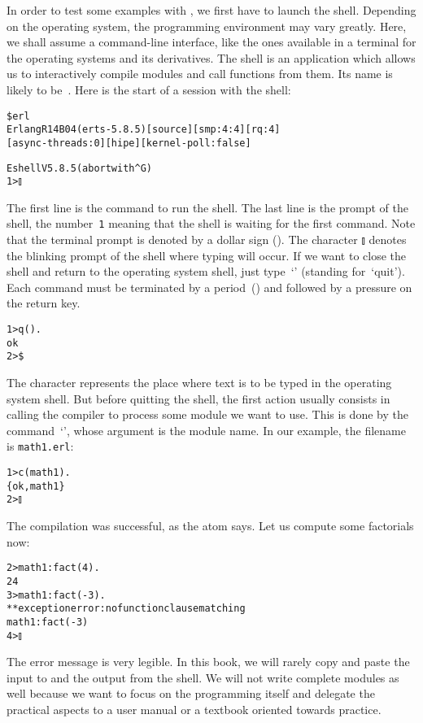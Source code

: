 In order to test some examples with , we first have to
launch the \Erlang shell. Depending on the operating system, the
programming environment may vary greatly. Here, we shall assume a
command\hyp{}line interface, like the ones available in a terminal for
the \Unix operating systems and its derivatives. The \Erlang shell is
an application which allows us to interactively compile modules and
call functions from them. Its name is likely to be~. Here
is the start of a session with the shell:
\begin{alltt}
\$ erl
Erlang R14B04 (erts-5.8.5) [source] [smp:4:4] [rq:4]
[async-threads:0] [hipe] [kernel-poll:false]

Eshell V5.8.5  (abort with ^G)
1> \(\talloblong\)
\end{alltt}
The first line is the command to run the shell. The last line is the
prompt of the \Erlang shell, the number~\texttt{1} meaning that the
shell is waiting for the first command. Note that the terminal prompt
is denoted by a dollar sign (\erlcode{\$}). The character
\(\talloblong\) denotes the blinking prompt of the \Erlang shell where
typing will occur. If we want to close the shell and return to the
operating system shell, just type~`' (standing
for~`quit'). Each command must be terminated by a period~()
and followed by a pressure on the return key.
\begin{alltt}
1> q().
ok
2> \$ \textvisiblespace
\end{alltt}
The character \erlcode{\textvisiblespace} represents the place where
text is to be typed in the operating system shell. But before quitting
the \Erlang shell, the first action usually consists in calling the
\Erlang compiler to process some module we want to use. This is done
by the command~`', whose argument is the module name. In
our example, the filename is \texttt{math1.erl}:
\begin{alltt}
1> c(math1).
\{ok,math1\}
2> \(\talloblong\)
\end{alltt}
The compilation was successful, as the atom  says. Let us
compute some factorials now:
\begin{alltt}
2> math1:fact(4).
24
3> math1:fact(-3).
** exception error: no function clause matching
math1:fact(-3)
4> \(\talloblong\)
\end{alltt}
The error message is very legible. In this book, we will rarely copy
and paste the input to and the output from the \Erlang shell. We will
not write complete modules as well because we want to focus on the
programming itself and delegate the practical aspects to a user manual
or a textbook oriented towards practice.


